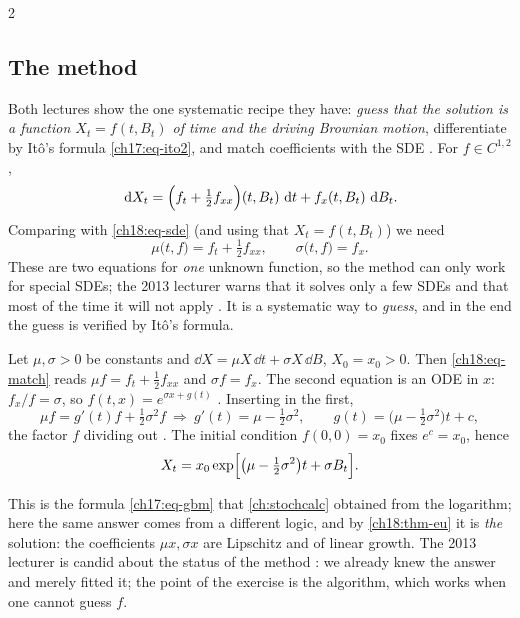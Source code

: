 \begin{paracol}{2}
\subsection{The method}
Both lectures show the one systematic recipe they have: \emph{guess that the solution is a function $X_t=f(t,B_t)$ of time and the driving Brownian motion}, differentiate by It\^o's formula \eqref{ch17:eq-ito2}, and match coefficients with the SDE . For $f\in C^{1,2}$,
\[
  \,\mathrm{d} X_t=\Bigl(f_t+\tfrac12f_{xx}\Bigr)(t,B_t)\,\,\mathrm{d} t+f_x(t,B_t)\,\,\mathrm{d} B_t .
\]
Comparing with \eqref{ch18:eq-sde} (and using that $X_t=f(t,B_t)$) we need
\begin{equation}\label{ch18:eq-match}
  \mu\bigl(t,f\bigr)=f_t+\tfrac12f_{xx},\qquad \sigma\bigl(t,f\bigr)=f_x .
\end{equation}
These are two equations for \emph{one} unknown function, so the method can only work for special SDEs; the 2013 lecturer warns that it solves only a few SDEs and that most of the time it will not apply . It is a systematic way to \emph{guess}, and in the end the guess is verified by It\^o's formula.

\begin{example}\label{ch18:ex-gbm}
Let $\mu,\sigma>0$ be constants and $\dd X=\mu X\,\dd t+\sigma X\,\dd B$, $X_0=x_0>0$. Then \eqref{ch18:eq-match} reads $\mu f=f_t+\tfrac12f_{xx}$ and $\sigma f=f_x$. The second equation is an ODE in $x$: $f_x/f=\sigma$, so $f(t,x)=e^{\sigma x+g(t)}$ . Inserting in the first,
\[
  \mu f=g'(t)f+\tfrac12\sigma^2f\ \Longrightarrow\ g'(t)=\mu-\tfrac12\sigma^2,\qquad g(t)=\bigl(\mu-\tfrac12\sigma^2\bigr)t+c ,
\]
the factor $f$ dividing out . The initial condition $f(0,0)=x_0$ fixes $e^c=x_0$, hence
\begin{equation}\label{ch18:eq-gbmsol}
  X_t=x_0\exp\Bigl[\bigl(\mu-\tfrac12\sigma^2\bigr)t+\sigma B_t\Bigr].
\end{equation}
\end{example}
This is the formula \eqref{ch17:eq-gbm} that \cref{ch:stochcalc} obtained from the logarithm; here the same answer comes from a different logic, and by \cref{ch18:thm-eu} it is \emph{the} solution: the coefficients $\mu x,\sigma x$ are Lipschitz and of linear growth. The 2013 lecturer is candid about the status of the method : we already knew the answer and merely fitted it; the point of the exercise is the algorithm, which works when one cannot guess $f$.


\end{paracol}
